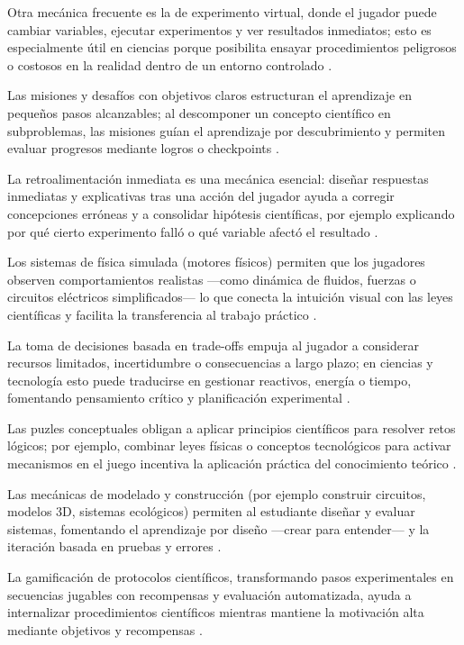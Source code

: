 \begin{enumerate}
    Otra mecánica frecuente es la de experimento virtual, donde el jugador puede cambiar variables, ejecutar experimentos y ver resultados inmediatos; esto es especialmente útil en ciencias porque posibilita ensayar procedimientos peligrosos o costosos en la realidad dentro de un entorno controlado \cite{}.

    Las misiones y desafíos con objetivos claros estructuran el aprendizaje en pequeños pasos alcanzables; al descomponer un concepto científico en subproblemas, las misiones guían el aprendizaje por descubrimiento y permiten evaluar progresos mediante logros o checkpoints \cite{}.

    La retroalimentación inmediata es una mecánica esencial: diseñar respuestas inmediatas y explicativas tras una acción del jugador ayuda a corregir concepciones erróneas y a consolidar hipótesis científicas, por ejemplo explicando por qué cierto experimento falló o qué variable afectó el resultado \cite{}.

    Los sistemas de física simulada (motores físicos) permiten que los jugadores observen comportamientos realistas —como dinámica de fluidos, fuerzas o circuitos eléctricos simplificados— lo que conecta la intuición visual con las leyes científicas y facilita la transferencia al trabajo práctico \cite{}.

    La toma de decisiones basada en trade-offs empuja al jugador a considerar recursos limitados, incertidumbre o consecuencias a largo plazo; en ciencias y tecnología esto puede traducirse en gestionar reactivos, energía o tiempo, fomentando pensamiento crítico y planificación experimental \cite{}.

    Las puzles conceptuales obligan a aplicar principios científicos para resolver retos lógicos; por ejemplo, combinar leyes físicas o conceptos tecnológicos para activar mecanismos en el juego incentiva la aplicación práctica del conocimiento teórico \cite{}.

    Las mecánicas de modelado y construcción (por ejemplo construir circuitos, modelos 3D, sistemas ecológicos) permiten al estudiante diseñar y evaluar sistemas, fomentando el aprendizaje por diseño —crear para entender— y la iteración basada en pruebas y errores \cite{}.

    La gamificación de protocolos científicos, transformando pasos experimentales en secuencias jugables con recompensas y evaluación automatizada, ayuda a internalizar procedimientos científicos mientras mantiene la motivación alta mediante objetivos y recompensas \cite{}.


\end{enumerate}
